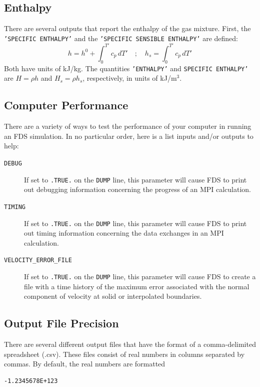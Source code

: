 \documentclass[11pt]{book}
\newcommand{\ct}{\tt\small}
\newcommand{\be}{\begin{equation}}
\newcommand{\ee}{\end{equation}}
\begin{document}
\subsection{Enthalpy}
\label{info:enthalpy}

There are several outputs that report the enthalpy of the gas mixture. First, the {\ct 'SPECIFIC ENTHALPY'} and the {\ct 'SPECIFIC SENSIBLE ENTHALPY'} are defined:
\be
   h = h^0 + \int_0^{T'} c_p \, dT'  \quad ; \quad h_s = \int_0^{T'} c_p \, dT'
\ee
Both have units of kJ/kg.
The quantities {\ct 'ENTHALPY'} and {\ct SPECIFIC ENTHALPY'} are $H=\rho h$ and $H_s=\rho h_s$, respectively, in units of kJ/m$^3$.


\subsection{Computer Performance}
\label{info:TIMING}

There are a variety of ways to test the performance of your computer in running an FDS simulation. In no particular order, here is a list inputs and/or outputs to help:
\begin{description}
\item[{\ct DEBUG}]  If set to {\ct .TRUE.} on the {\ct DUMP} line, this parameter will cause FDS to print out debugging information concerning the progress of an MPI
calculation.
\item[{\ct TIMING}] If set to {\ct .TRUE.} on the {\ct DUMP} line, this parameter will cause FDS to print out timing information concerning the data exchanges in an MPI
calculation.
\item[{\ct VELOCITY\_ERROR\_FILE}] If set to {\ct .TRUE.} on the {\ct DUMP} line, this parameter will cause FDS to create a file with a time history of the maximum error
associated with the normal component of velocity at solid or interpolated boundaries.
\end{description}


\subsection{Output File Precision}
\label{info:SIG_FIGS}

There are several different output files that have the format of a comma-delimited spreadsheet (.csv). These files consist of real numbers in columns separated by
commas. By default, the real numbers are formatted

\begin{verbatim}
-1.2345678E+123
\end{verbatim}
\end{document}
